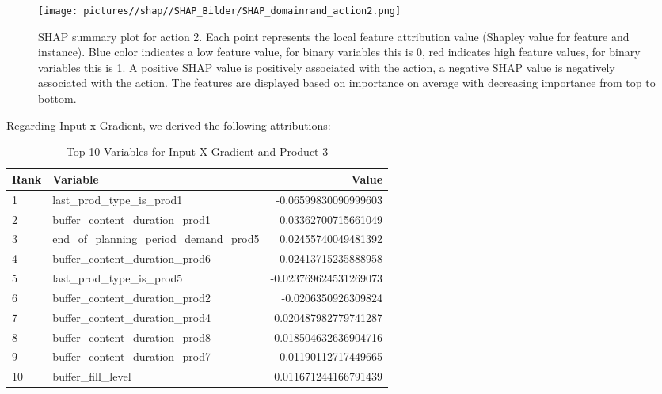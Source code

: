 \begin{figure}[H]
    \centering
    \texttt{[image: pictures//shap//SHAP\_Bilder/SHAP\_domainrand\_action2.png]}
    \caption{SHAP summary plot for action 2.
        Each point represents the local feature attribution value (Shapley value for feature and instance).
        Blue color indicates a low feature value, for binary variables this is 0, red indicates high feature values, for binary variables this is 1. A positive SHAP value is positively associated with the action, a negative SHAP value is negatively associated with the action. The features are displayed based on importance on average with decreasing importance from top to bottom.}
    \label{fig:SHAP_Action2}
\end{figure}

Regarding Input x Gradient, we derived the following attributions:

\begin{table}[ht!]
    \footnotesize
    \centering
    \caption{Top 10 Variables for Input X Gradient and Product 3}
    \label{tab:top_variables_target2}
    \begin{tabularx}{\textwidth}{lXr}
        \toprule
        \textbf{Rank} & \textbf{Variable}                        & \textbf{Value}        \\
        \midrule
        1             & last\_prod\_type\_is\_prod1              & -0.06599830090999603  \\
        2             & buffer\_content\_duration\_prod1         & 0.03362700715661049   \\
        3             & end\_of\_planning\_period\_demand\_prod5 & 0.02455740049481392   \\
        4             & buffer\_content\_duration\_prod6         & 0.02413715235888958   \\
        5             & last\_prod\_type\_is\_prod5              & -0.023769624531269073 \\
        6             & buffer\_content\_duration\_prod2         & -0.0206350926309824   \\
        7             & buffer\_content\_duration\_prod4         & 0.020487982779741287  \\
        8             & buffer\_content\_duration\_prod8         & -0.018504632636904716 \\
        9             & buffer\_content\_duration\_prod7         & -0.01190112717449665  \\
        10            & buffer\_fill\_level                      & 0.011671244166791439  \\
        \bottomrule
    \end{tabularx}
\end{table}
\FloatBarrier

